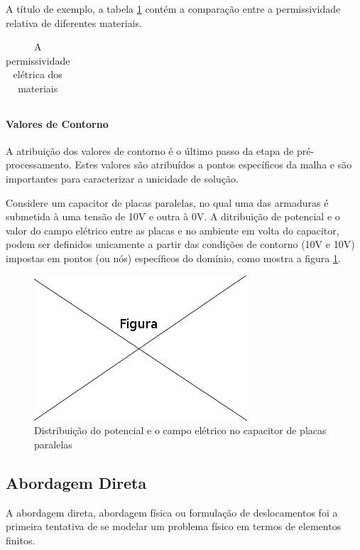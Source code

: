 A título de exemplo, a tabela \ref{tab:permissividade} contém a comparação entre a permissividade relativa de diferentes materiais.

\begin{table}	
	\centering
	\begin{tabular}{|c|c|}	

	\end{tabular}
	\caption{A permissividade elétrica dos materiais}
	\label{tab:permissividade}
\end{table}


\paragraph{Valores de Contorno \\}
A atribuição dos valores de contorno é o último passo da etapa de pré- processamento. Estes valores são atribuídos a pontos específicos da malha e são importantes para caracterizar a unicidade de solução.

Considere um capacitor de placas paralelas, no qual uma das armaduras é submetida à uma tensão de 10V e outra à 0V. A ditribuição de potencial e o valor do campo elétrico entre as placas e no ambiente em volta do capacitor, podem ser definidos unicamente a partir das condições de contorno (10V e 10V) impostas em pontos (ou nós) específicos do domínio, como mostra a figura \ref{fig:capacitor}.

\begin{figure}[!htb]
\centering
\includegraphics[scale=0.5]{figuras/temp.png}
\caption{Distribuição do potencial e o campo elétrico no capacitor de placas paralelas}
\label{fig:capacitor}
\end{figure}

\subsection{Abordagem Direta}

A abordagem direta, abordagem física ou formulação de deslocamentos foi a primeira tentativa de se modelar um problema físico em termos de elementos finitos.

